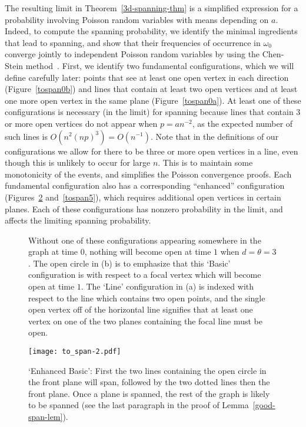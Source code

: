 The resulting limit in Theorem~\ref{3d-spanning-thm} is a simplified expression for a probability involving Poisson random variables with means depending on $a$.  Indeed, to compute the spanning probability, we identify the minimal ingredients that lead to spanning, and show that their frequencies of occurrence in $\omega_0$ converge jointly to independent Poisson random variables by using the Chen-Stein method~\cite{poissonbook}.  First, we identify two fundamental configurations, which we will define carefully later: points that see at least one open vertex in each direction (Figure~\ref{tospan0b}) and lines that contain at least two open vertices and at least one more open vertex in the same plane (Figure~\ref{tospan0a}).  At least one of these configurations is necessary (in the limit) for spanning because lines that contain 3 or more open vertices do not appear when $p= an^{-2}$, as the expected number of such lines is $O(n^2 (np)^3) = O(n^{-1})$.  Note that in the definitions of our configurations we allow for there to be three or more open vertices in a line, even though this is unlikely to occur for large $n$.  This is to maintain some monotonicity of the events, and simplifies the Poisson convergence proofs.  Each fundamental configuration also has a corresponding ``enhanced'' configuration (Figures~\ref{tospan2} and~\ref{tospan5}), which requires additional open vertices in certain planes.  Each of these configurations has nonzero probability in the limit, and affects the limiting spanning probability.
\begin{figure}[htd]
	\centering
	\hspace{.2in}
	\caption{Without one of these configurations appearing somewhere in the graph at time $0$, nothing will become open at time $1$ when $d=\theta=3$.  The open circle in (b) is to emphasize that this `Basic' configuration is with respect to a focal vertex which will become open at time $1$.  The `Line' configuration in (a) is indexed with respect to the line which contains two open points, and the single open vertex off of the horizontal line signifies that at least one vertex on one of the two planes containing the focal line must be open.}
	\label{tospan0}
\end{figure}

\begin{figure}[htd]
	\centering
	\texttt{[image: to\_span-2.pdf]}
	\caption{`Enhanced Basic': First the two lines containing the open circle in the front plane will span, followed by the two dotted lines then the front plane. Once a plane is spanned, the rest of the graph is likely to be spanned (see the last paragraph in the proof of Lemma~\ref{good-span-lem}).}
	\label{tospan2}
\end{figure}

